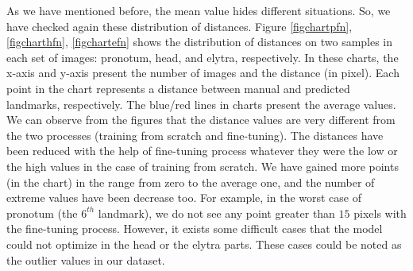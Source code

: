 \documentclass[review]{elsarticle}
\begin{document}
As we have mentioned before, the mean value hides different situations. So, we have checked again these distribution of distances. Figure \ref{figchartpfn}, \ref{figcharthfn}, \ref{figchartefn} shows the distribution of distances on two samples in each set of images: pronotum, head, and elytra, respectively. In these charts, the x-axis and y-axis present the number of images and the distance (in pixel). Each point in the chart represents a distance between manual and predicted landmarks, respectively. The blue/red lines in charts present the average values. We can observe from the figures that the distance values are very different from the two processes (training from scratch and fine-tuning). The distances have been reduced with the help of fine-tuning process whatever they were the low or the high values in the case of training from scratch. We have gained more points (in the chart) in the range from zero to the average one, and the number of extreme values have been decrease too. For example, in the worst case of pronotum (the $6^{th}$ landmark), we do not see any point greater than $15$ pixels with the fine-tuning process. However, it exists some difficult cases that the model could not optimize in the head or the elytra parts. These cases could be noted as the outlier values in our dataset.
\end{document}
